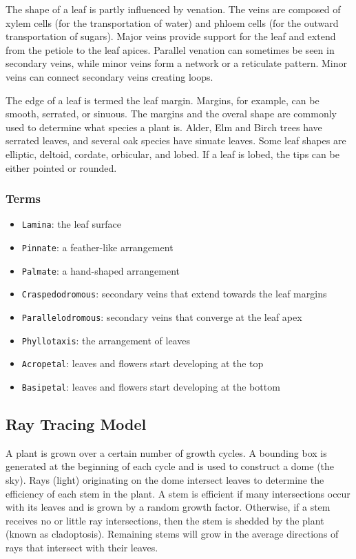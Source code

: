 \documentclass[10pt]{article}
\begin{document}
The shape of a leaf is partly influenced by venation. The veins are composed of xylem cells (for the transportation of water) and phloem cells (for the outward transportation of sugars). Major veins provide support for the leaf and extend from the petiole to the leaf apices. Parallel venation can sometimes be seen in secondary veins, while minor veins form a network or a reticulate pattern. Minor veins can connect secondary veins creating loops.

The edge of a leaf is termed the leaf margin. Margins, for example, can be smooth, serrated, or sinuous. The margins and the overal shape are commonly used to determine what species a plant is. Alder, Elm and Birch trees have serrated leaves, and several oak species have sinuate leaves. Some leaf shapes are elliptic, deltoid, cordate, orbicular, and lobed. If a leaf is lobed, the tips can be either pointed or rounded.

\subsubsection{Terms}

\begin{itemize}
\item \texttt{Lamina}: the leaf surface
\item \texttt{Pinnate}: a feather-like arrangement
\item \texttt{Palmate}: a hand-shaped arrangement
\item \texttt{Craspedodromous}: secondary veins that extend towards the leaf margins
\item \texttt{Parallelodromous}: secondary veins that converge at the leaf apex
\item \texttt{Phyllotaxis}: the arrangement of leaves
\item \texttt{Acropetal}: leaves and flowers start developing at the top
\item \texttt{Basipetal}: leaves and flowers start developing at the bottom
\end{itemize}

\subsection{Ray Tracing Model}

A plant is grown over a certain number of growth cycles. A bounding box is generated at the beginning of each cycle and is used to construct a dome (the sky). Rays (light) originating on the dome intersect leaves to determine the efficiency of each stem in the plant. A stem is efficient if many intersections occur with its leaves and is grown by a random growth factor. Otherwise, if a stem receives no or little ray intersections, then the stem is shedded by the plant (known as cladoptosis). Remaining stems will grow in the average directions of rays that intersect with their leaves.
\end{document}
